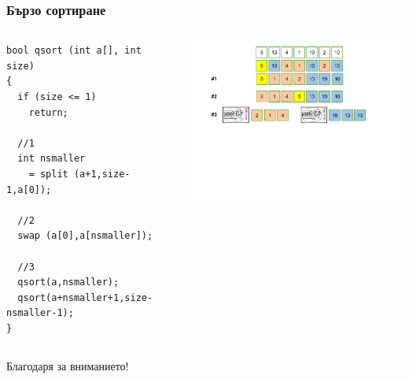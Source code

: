 \documentclass{beamer}
\begin{document}
\begin{frame}[fragile]
\frametitle{Бързо сортиране}



\begin{columns}[t]
  \begin{column}{0.5\textwidth}

\begin{lstlisting}
bool qsort (int a[], int size)
{
  if (size <= 1)
    return;
  
  //1
  int nsmaller 
    = split (a+1,size-1,a[0]);
  
  //2
  swap (a[0],a[nsmaller]);

  //3
  qsort(a,nsmaller);
  qsort(a+nsmaller+1,size-nsmaller-1);
}
\end{lstlisting}


  \end{column}
  \begin{column}{0.5\textwidth}
\vspace*{-1pt}
\hspace*{-50pt}
\includegraphics[width=9cm]{images/qsort} 

  \end{column}
\end{columns}



\end{frame}



\begin{frame}
\centerline{Благодаря за вниманието!}
\end{frame}
\end{document}
